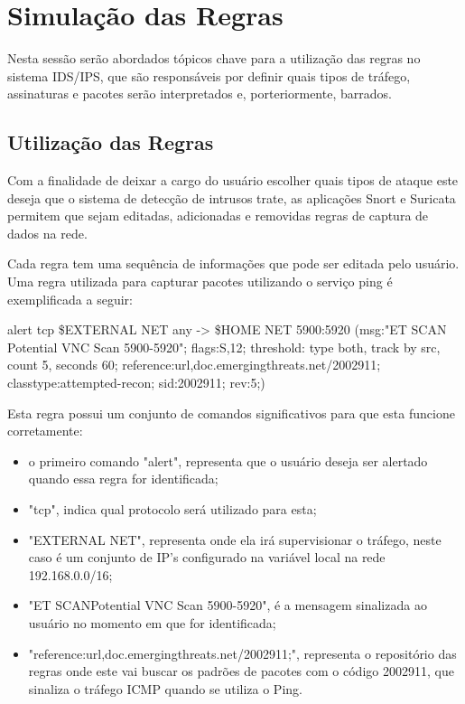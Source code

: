 \chapter{Simulação das Regras}
\label{chap:rules}

Nesta sessão serão abordados tópicos chave para a utilização das regras no sistema
IDS/IPS, que são responsáveis por definir quais tipos de tráfego, assinaturas e
pacotes serão interpretados e, porteriormente, barrados.

\section{Utilização das Regras}
Com a finalidade de deixar a cargo do usuário escolher quais tipos de ataque este deseja
que o sistema de detecção de intrusos trate, as aplicações Snort e Suricata permitem
que sejam editadas, adicionadas e removidas regras de captura de dados na rede.


Cada regra tem uma sequência de informações que pode ser editada pelo usuário.
Uma regra utilizada para capturar pacotes utilizando o serviço ping é exemplificada
a seguir:


\begin{framed}
alert tcp \$EXTERNAL NET any -> \$HOME NET 5900:5920 (msg:"ET SCAN
Potential VNC Scan 5900-5920"; flags:S,12; threshold: type both, track by src,
count 5, seconds 60; reference:url,doc.emergingthreats.net/2002911;
classtype:attempted-recon; sid:2002911; rev:5;)
\end{framed}

Esta regra possui um conjunto de comandos significativos para que esta funcione
corretamente:

\begin{itemize}
  \item o primeiro comando "alert", representa que o usuário deseja ser alertado quando
  essa regra for identificada;
  \item  "tcp", indica qual protocolo será utilizado para esta;
  \item "EXTERNAL NET", representa onde ela irá supervisionar o tráfego, neste caso é um
  conjunto de IP's configurado na variável local na rede 192.168.0.0/16;
  \item "ET SCANPotential VNC Scan 5900-5920", é a mensagem sinalizada ao usuário no momento
  em que for identificada;
  \item "reference:url,doc.emergingthreats.net/2002911;",
 representa o repositório das regras onde este vai buscar os padrões de pacotes
 com o código 2002911, que sinaliza o tráfego ICMP quando se utiliza o Ping.
\end{itemize}

